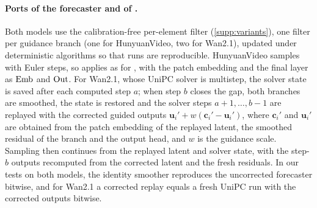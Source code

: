\paragraph{Ports of the forecaster and of \pcgs.}
Both models use the calibration-free per-element filter (\cref{supp:variants}), one filter per guidance branch (one for
HunyuanVideo, two for Wan2.1), updated under deterministic algorithms so that runs are reproducible. HunyuanVideo
samples with Euler steps, so \pcgs applies as for \flux, with the patch embedding and the final layer as $\operatorname{Emb}$ and
$\operatorname{Out}$. For Wan2.1, whose UniPC solver is multistep, the solver state is saved after each computed step $a$; when step
$b$ closes the gap, both branches are smoothed, the state is restored and the solver steps $a{+}1,\dots,b{-}1$ are
replayed with the corrected guided outputs $\mathbf u_i'+w(\mathbf c_i'-\mathbf u_i')$, where $\mathbf c_i'$ and
$\mathbf u_i'$ are obtained from the patch embedding of the replayed latent, the smoothed residual of the branch and the
output head, and $w$ is the guidance scale. Sampling then continues from the replayed latent and solver state, with the
step-$b$ outputs recomputed from the corrected latent and the fresh residuals. In our tests on both models, the identity
smoother reproduces the uncorrected forecaster bitwise, and for Wan2.1 a corrected replay equals a fresh UniPC run with
the corrected outputs bitwise.

